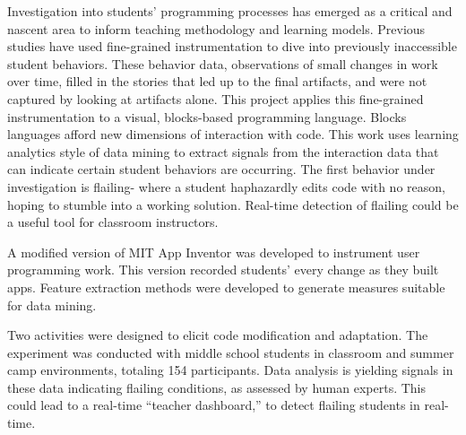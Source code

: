 % 
% 
%

Investigation into students' programming processes has emerged as a critical and nascent area to inform teaching methodology and learning models. Previous studies have used fine-grained instrumentation to dive into previously inaccessible student behaviors. These behavior data, observations of small changes in work over time, filled in the stories that led up to the final artifacts, and were not captured by looking at artifacts alone. This project applies this fine-grained instrumentation to a visual, blocks-based programming language. Blocks languages afford new dimensions of interaction with code. This work uses learning analytics style of data mining to extract signals from the interaction data that can indicate certain student behaviors are occurring. The first behavior under investigation is flailing- where a student haphazardly edits code with no reason, hoping to stumble into a working solution. Real-time detection of flailing could be a useful tool for classroom instructors.

A modified version of MIT App Inventor was developed to instrument user programming work. This version recorded students’ every change as they built apps. Feature extraction methods were developed to generate measures suitable for data mining.

Two activities were designed to elicit code modification and adaptation. The experiment was conducted with middle school students in classroom and summer camp environments, totaling 154 participants. Data analysis is yielding signals in these data indicating flailing conditions, as assessed by human experts. This could lead to a real-time “teacher dashboard,” to detect flailing students in real-time.
